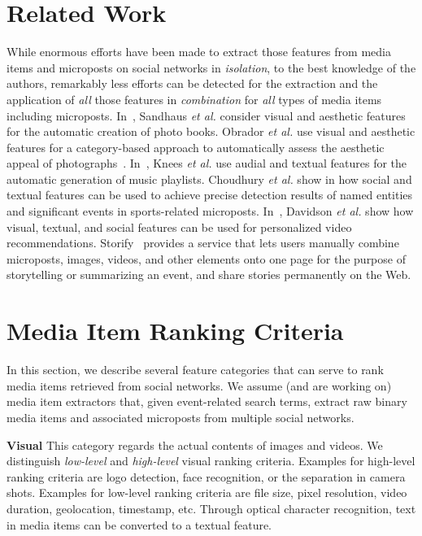 \documentclass{article}
\begin{document}
\section{Related Work}
While enormous efforts have been made to extract those features
from media items and microposts on social networks in \emph{isolation},
to the best knowledge of the authors, remarkably less efforts 
can be detected for the extraction and the application
of \emph{all} those features in \emph{combination}
for \emph{all} types of media items including microposts.
In~\cite{Photo2011}, Sandhaus \emph{et al.} consider visual and
aesthetic features for the automatic creation of photo books.
Obrador \emph{et al.} use visual and aesthetic features
for a category-based approach to automatically assess
the aesthetic appeal of photographs~\cite{Photo2012}.
In~\cite{Playlist2006}, Knees \emph{et al.} use audial and textual
features for the automatic generation of music playlists.
Choudhury \emph{et al.} show in \cite{Sports2011} how social and textual
features can be used to achieve precise detection results 
of named entities and significant events in sports-related microposts.
In~\cite{YouTube2010}, Davidson \emph{et al.} show how visual,
textual, and social features can be used for personalized video recommendations.
Storify~\cite{Storify2011} provides a service that lets users manually combine
microposts, images, videos, and other elements onto one page for the purpose
of storytelling or summarizing an event,
and share stories permanently on the Web.

\section{Media Item Ranking Criteria}
In this section, we describe several feature categories that can serve to rank
media items retrieved from social networks. 
We assume (and are working on) media item extractors that,
given event-related search terms,
extract raw binary media items and associated microposts
from multiple social networks.

\noindent \textbf{Visual}
This category regards the actual contents of images and videos.
We distinguish \emph{low-level} and \emph{high-level} visual ranking criteria.
Examples for high-level ranking criteria are logo detection,
face recognition, or the separation in camera shots.
Examples for low-level ranking criteria are file size, pixel resolution,
video duration, geolocation, timestamp, etc.
Through optical character recognition,
text in media items can be converted to a textual feature.
\end{document}
